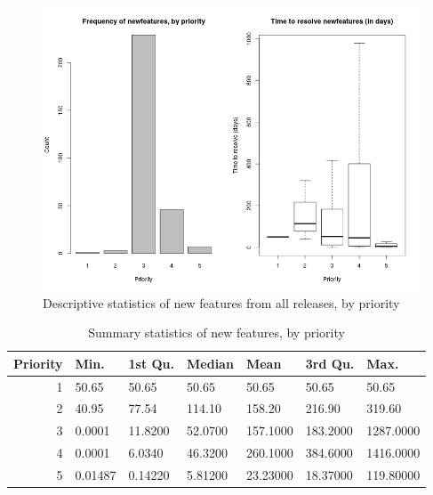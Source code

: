 \documentclass[a4paper]{scrartcl}
\begin{document}
\begin{figure}
\begin{center}
\includegraphics[width=6in]{exploratory_results/mongodb_allreleases/newfeatures}
\caption{Descriptive statistics of new features from all releases, by priority}
\label{fig:all_newfeatures}
\end{center}
\end{figure}

\begin{table}[h!]
\caption{Summary statistics of new features, by priority}
\centering
\begin{tabular}{ r | l | l | l | l |  l | l }
\hline
Priority & Min. & 1st Qu. & Median & Mean & 3rd Qu. & Max. \\
\hline\hline
1 & 50.65 & 50.65 & 50.65 & 50.65 & 50.65 & 50.65 \\
2 & 40.95 & 77.54 & 114.10 & 158.20 & 216.90 & 319.60 \\
3 & 0.0001 & 11.8200 & 52.0700 & 157.1000 & 183.2000 & 1287.0000 \\
4 & 0.0001 & 6.0340 & 46.3200 & 260.1000 & 384.6000 & 1416.0000 \\
5 & 0.01487 & 0.14220 & 5.81200 & 23.23000 & 18.37000 & 119.80000 \\
\hline
\end{tabular}
\label{tab:all_newfeatures_summary}
\end{table}
\end{document}
